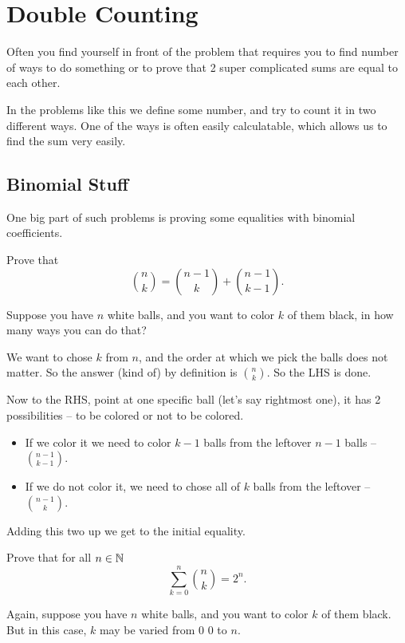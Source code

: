 \chapter{Double Counting}

Often you find yourself in front of the problem that requires you to find number of ways to do something or to prove that 2 super complicated sums are equal to each other.

In the problems like this we define some number, and try to count it in two different ways. One of the ways is often easily calculatable, which allows us to find the sum very easily.

\section{Binomial Stuff}

One big part of such problems is proving some equalities with binomial coefficients.

\begin{example}
    Prove that \[\binom nk = \binom{n-1}k+\binom{n-1}{k-1}.\]
\end{example}

Suppose you have $n$ white balls, and you want to color $k$ of them black, in how many ways you can do that?

We want to chose $k$ from $n$, and the order at which we pick the balls does not matter. So the answer (kind of) by definition is $\binom nk$. So the LHS is done.

Now to the RHS, point at one specific ball (let's say rightmost one), it has 2 possibilities -- to be colored or not to be colored.
\begin{itemize}
    \item If we color it we need to color $k-1$ balls from the leftover $n-1$ balls -- $\binom{n-1}{k-1}$.
    \item If we do not color it, we need to chose all of $k$ balls from the leftover -- $\binom{n-1}k$.
\end{itemize}

Adding this two up we get to the initial equality.

\begin{example}
    Prove that for all $n\in\mathbb N$ \[\sum_{k=0}^n\binom nk=2^n.\]
\end{example}

Again, suppose you have $n$ white balls, and you want to color $k$ of them black. But in this case, $k$ may be varied from 0 $0$ to $n$.

